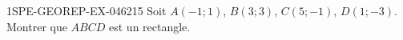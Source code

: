 \begin{exercice}{1SPE-GEOREP-EX-046}{2}{15}
Soit $A(-1 ; 1)$, $B(3 ; 3)$, $C(5 ; -1)$, $D(1 ; -3)$. Montrer que $ABCD$ est un rectangle.
\end{exercice}
